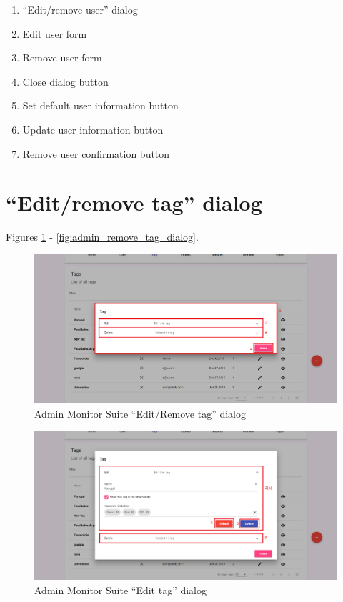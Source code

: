 \begin{enumerate}
    \item ``Edit/remove user'' dialog
    \item Edit user form
    \item Remove user form
    \item Close dialog button
    \item Set default user information button
    \item Update user information button
    \item Remove user confirmation button
\end{enumerate}

\clearpage

\section{``Edit/remove tag'' dialog}
\label{sec:admin_edit_tag_dialog}

Figures \ref{fig:admin_edit_remove_tag_dialog} - \ref{fig:admin_remove_tag_dialog}.

\begin{figure}[H]
    \centering
    \includegraphics[width=\linewidth]{lib/images/admin/admin_edit_remove_tag_dialog.png}
    \caption{Admin Monitor Suite ``Edit/Remove tag'' dialog}
    \label{fig:admin_edit_remove_tag_dialog}
\end{figure}

\begin{figure}[H]
    \centering
    \includegraphics[width=\linewidth]{lib/images/admin/admin_edit_tag_dialog.png}
    \caption{Admin Monitor Suite ``Edit tag'' dialog}
    \label{fig:admin_edit_tag_dialog}
\end{figure}

